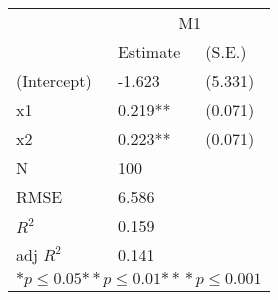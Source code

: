 \begin{tabular}{*{3}{l}}
\hline
                  & \multicolumn{2}{c}{M1}   \tabularnewline
                   &Estimate  &(S.E.)  \tabularnewline
 \hline
 \hline
   (Intercept)     &-1.623   &   (5.331) \tabularnewline
   x1              &0.219**   &   (0.071) \tabularnewline
   x2              &0.223**   &   (0.071) \tabularnewline
 \hline
 N                 &100       &        \tabularnewline
 RMSE             &6.586         & \tabularnewline
 $R^2$             &0.159         & \tabularnewline
 adj $R^2$         &0.141         & \tabularnewline
 \hline
\hline
 
 \multicolumn{3}{c}{${*  p}\le 0.05$${*\!\!*  p}\le 0.01$${*\!\!*\!\!*  p}\le 0.001$}\tabularnewline
 \end{tabular}